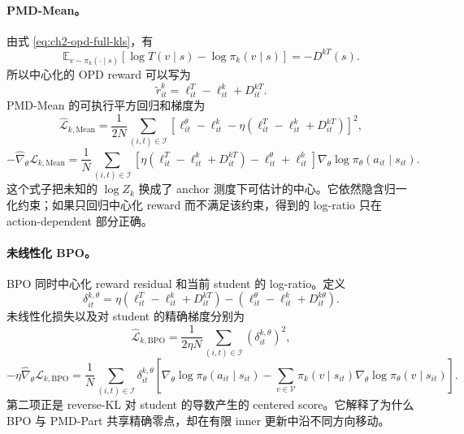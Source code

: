 \paragraph*{PMD-Mean。}
由式 \eqref{eq:ch2-opd-full-kls}，有
\[
 \mathbb E_{v\sim\pi_k(\cdot\mid s)}
 [\log T(v\mid s)-\log\pi_k(v\mid s)]
 =-D^{kT}(s).
\]
所以中心化的 OPD reward 可以写为
\[
 \widetilde r^k_{it}=\ell^T_{it}-\ell^k_{it}+D^{kT}_{it}.
\]
PMD-Mean 的可执行平方回归和梯度为
\begin{equation}
\label{eq:ch2-opd-mean-explicit-loss}
 \widehat{\mathcal L}_{k,\mathrm{Mean}}
 =\frac1{2N}\sum_{(i,t)\in\mathcal I}
 \left[\ell^\theta_{it}-\ell^k_{it}
 -\eta(\ell^T_{it}-\ell^k_{it}+D^{kT}_{it})\right]^2,
\end{equation}
\begin{equation}
\label{eq:ch2-opd-mean-explicit-gradient}
 -\widehat\nabla_\theta\mathcal L_{k,\mathrm{Mean}}
 =\frac1N\sum_{(i,t)\in\mathcal I}
 \left[\eta(\ell^T_{it}-\ell^k_{it}+D^{kT}_{it})
 -\ell^\theta_{it}+\ell^k_{it}\right]
 \nabla_\theta\log\pi_\theta(a_{it}\mid s_{it}).
\end{equation}
这个式子把未知的 $\log Z_k$ 换成了 anchor 测度下可估计的中心。它依然隐含归一化约束；如果只回归中心化 reward 而不满足该约束，得到的 log-ratio 只在 action-dependent 部分正确。

\paragraph*{未线性化 BPO。}
BPO 同时中心化 reward residual 和当前 student 的 log-ratio。定义
\begin{equation}
\label{eq:ch2-opd-bpo-explicit-residual}
 \delta^{k,\theta}_{it}
 =\eta(\ell^T_{it}-\ell^k_{it}+D^{kT}_{it})
 -\left(\ell^\theta_{it}-\ell^k_{it}+D^{k\theta}_{it}\right).
\end{equation}
未线性化损失以及对 student 的精确梯度分别为
\begin{equation}
\label{eq:ch2-opd-bpo-explicit-loss}
 \widehat{\mathcal L}_{k,\mathrm{BPO}}
 =\frac1{2\eta N}\sum_{(i,t)\in\mathcal I}
 \left(\delta^{k,\theta}_{it}\right)^2,
\end{equation}
\begin{equation}
\label{eq:ch2-opd-bpo-explicit-gradient}
 -\eta\widehat\nabla_\theta\mathcal L_{k,\mathrm{BPO}}
 =\frac1N\sum_{(i,t)\in\mathcal I}\delta^{k,\theta}_{it}
 \left[
 \nabla_\theta\log\pi_\theta(a_{it}\mid s_{it})
 -\sum_{v\in\mathcal V}\pi_k(v\mid s_{it})
 \nabla_\theta\log\pi_\theta(v\mid s_{it})
 \right].
\end{equation}
第二项正是 reverse-KL 对 student 的导数产生的 centered score。它解释了为什么 BPO 与 PMD-Part 共享精确零点，却在有限 inner 更新中沿不同方向移动。

